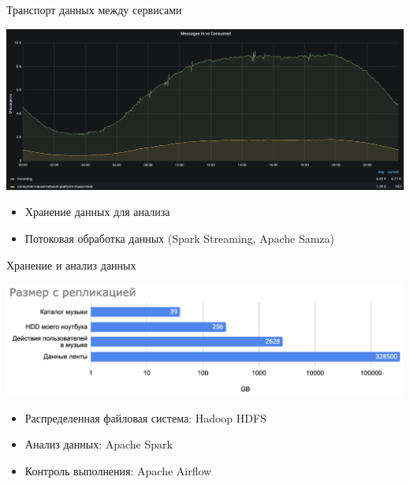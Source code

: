 \documentclass[11pt,aspectratio=169,handout]{beamer}
\begin{document}
\begin{frame}{Транспорт данных между сервисами}

\begin{center}
\includegraphics[scale=0.25]{images/music-activity.png}
\end{center}

\begin{itemize}[<+->]
\item Хранение данных для анализа
\item Потоковая обработка данных (Spark Streaming, Apache Samza)
\end{itemize}

\end{frame}

\begin{frame}{Хранение и анализ данных}

\begin{center}
\includegraphics[scale=0.5]{images/data-size.png}
\end{center}

\pause

\begin{itemize}[<+->]
\item Распределенная файловая система: Hadoop HDFS
\item Анализ данных: Apache Spark
\item Контроль выполнения: Apache Airflow
\end{itemize}

\end{frame}
\end{document}
